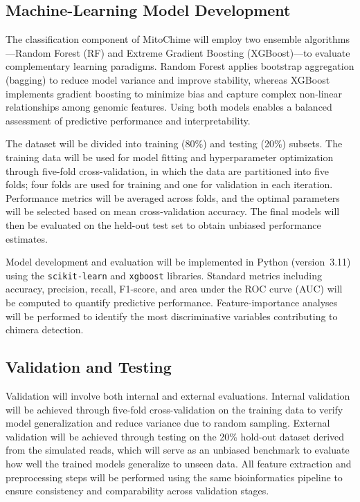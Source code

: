 \subsection{Machine-Learning Model Development}

The classification component of MitoChime will employ two ensemble algorithms—Random Forest (RF) and Extreme Gradient Boosting (XGBoost)—to evaluate complementary learning paradigms. Random Forest applies bootstrap aggregation (bagging) to reduce model variance and improve stability, whereas XGBoost implements gradient boosting to minimize bias and capture complex non-linear relationships among genomic features. Using both models enables a balanced assessment of predictive performance and interpretability.

The dataset will be divided into training (80\%) and testing (20\%) subsets. The training data will be used for model fitting and hyperparameter optimization through five-fold cross-validation, in which the data are partitioned into five folds; four folds are used for training and one for validation in each iteration. Performance metrics will be averaged across folds, and the optimal parameters will be selected based on mean cross-validation accuracy. The final models will then be evaluated on the held-out test set to obtain unbiased performance estimates.

Model development and evaluation will be implemented in Python (version~3.11) using the \texttt{scikit-learn} and \texttt{xgboost} libraries. Standard metrics including accuracy, precision, recall, F1-score, and area under the ROC curve (AUC) will be computed to quantify predictive performance. Feature-importance analyses will be performed to identify the most discriminative variables contributing to chimera detection.

\subsection{Validation and Testing}

Validation will involve both internal and external evaluations. Internal validation will be achieved through five-fold cross-validation on the training data to verify model generalization and reduce variance due to random sampling. External validation will be achieved through testing on the 20\% hold-out dataset derived from the simulated reads, which will serve as an unbiased benchmark to evaluate how well the trained models generalize to unseen data. All feature extraction and preprocessing steps will be performed using the same bioinformatics pipeline to ensure consistency and comparability across validation stages.

